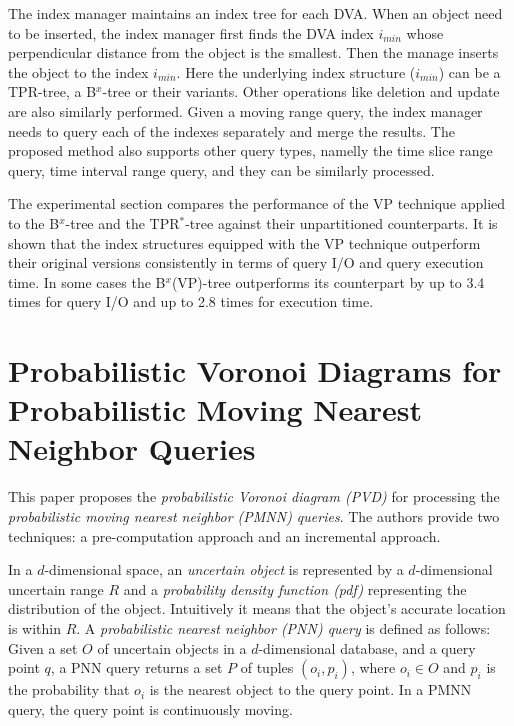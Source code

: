 \documentclass[paper=a4, fontsize=18pt]{article} %
\numberwithin{equation}{section} %
\numberwithin{figure}{section} %
\numberwithin{table}{section} %
\begin{document}
The index manager maintains an index tree for each DVA. When an object need to be inserted, the index manager first finds the DVA index $i_{min}$ whose perpendicular distance from the object is the smallest. Then the manage inserts the object to the index $i_{min}$. Here the underlying index structure ($i_{min}$) can be a TPR-tree, a B$^x$-tree or their variants. Other operations like deletion and update are also similarly performed. Given a moving range query, the index manager needs to query each of the indexes separately and merge the results. The proposed method also supports other query types, namelly the time slice range query, time interval range query, and they can be similarly processed.

The experimental section compares the performance of the VP technique applied to the B$^x$-tree and the TPR$^*$-tree against their unpartitioned  counterparts. It is shown that the index structures equipped with the VP technique outperform their original versions consistently in terms of query I/O and query execution time. In some cases the B$^x$(VP)-tree outperforms its counterpart by up to 3.4 times for query I/O and up to 2.8 times for execution time.

\section{Probabilistic Voronoi Diagrams for Probabilistic Moving Nearest Neighbor Queries \cite{ATZR12}}

This paper proposes the \emph{probabilistic Voronoi diagram (PVD)} for processing the \emph{probabilistic moving nearest neighbor (PMNN) queries}. The authors provide two techniques: a pre-computation approach and an incremental approach.

In a $d$-dimensional  space, an \emph{uncertain object} is represented by a $d$-dimensional uncertain range $R$ and a \emph{probability density function (pdf)} representing the distribution of the object. Intuitively it means that the object's accurate location is within $R$. A \emph{probabilistic nearest neighbor (PNN) query} is defined as follows: Given a set $O$ of uncertain objects in a $d$-dimensional database, and a query point $q$, a PNN query returns a set $P$ of tuples $(o_i, p_i)$, where $o_i \in O$ and $p_i$ is the probability that $o_i$ is the nearest object to the query point. In a PMNN query, the query point is continuously moving.
\end{document}
